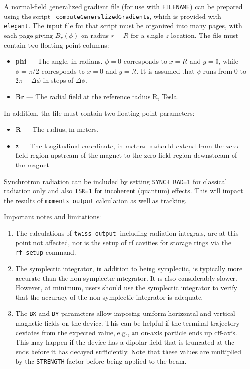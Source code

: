 A normal-field generalized gradient file (for use with \verb|FILENAME|) can be prepared using the script {\tt
  computeGeneralizedGradients}, which is provided with {\tt elegant}. The input file for that script must be organized
into many pages, with each page giving $B_r(\phi)$ on radius $r=R$ for a single $z$ location. The file must contain two
floating-point columns:
\begin{itemize}
\item {\bf phi} --- The angle, in radians. $\phi=0$ corresponds to $x=R$ and $y=0$, while $\phi=\pi/2$ corresponds
  to $x=0$ and $y=R$. It is assumed that $\phi$ runs from $0$ to $2\pi - \Delta \phi$ in steps of $\Delta \phi$.
\item {\bf Br} --- The radial field at the reference radius R, Tesla.
\end{itemize}
In addition, the file must contain two floating-point parameters:
\begin{itemize}
\item {\bf R} --- The radius, in meters. 
\item {\bf z} --- The longitudinal coordinate, in meters. $z$ should extend from the zero-field region upstream of the magnet to 
  the zero-field region downstream of the magnet.
\end{itemize}

Synchrotron radiation can be included by setting \verb|SYNCH_RAD=1| for classical radiation only and
also \verb|ISR=1| for incoherent (quantum) effects. 
This will impact the results of \verb|moments_output| calculation as well as tracking.

Important notes and limitations:
\begin{enumerate}
\item The calculations of \verb|twiss_output|, including radiation integrals, are at this point not affected,
nor is the setup of rf cavities for storage rings via the \verb|rf_setup| command.
\item The symplectic integrator, in addition to being symplectic, is typically more accurate than the non-symplectic integrator.
  It is also considerably slower.
  However, at minimum, users should use the symplectic integrator to verify that the accuracy of the non-symplectic integrator
  is adequate.
\item The \verb|BX| and \verb|BY| parameters allow imposing uniform horizontal and vertical magnetic fields 
  on the device.
  This can be helpful if the terminal trajectory deviates from the expected value, e.g., an on-axis particle  
  ends up off-axis. This may happen if the device has
  a dipolar field that is truncated at the ends before it has decayed sufficiently.
  Note that these values are multiplied by the \verb|STRENGTH| factor before being applied to the beam.
\end{enumerate}

